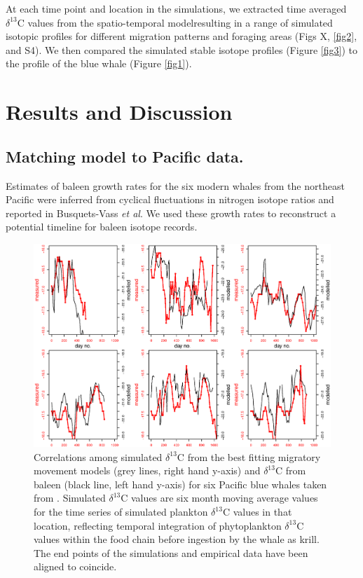 \documentclass[a4paper,12pt]{article}
\begin{document}
At each time point and location in the simulations, we extracted time averaged \(\delta^{13}\)C values from the spatio-temporal model\cite{magozzi2017using}resulting in a range of simulated isotopic profiles for different migration patterns and foraging areas (Figs X, \ref{fig2}, and S4).
We then compared the simulated stable isotope profiles (Figure \ref{fig3}) to the profile of the blue whale (Figure \ref{fig1}).

\section{Results and Discussion}

\subsection{Matching model to Pacific data.}

Estimates of baleen growth rates for the six modern whales from the northeast Pacific were inferred from cyclical fluctuations in nitrogen isotope ratios and reported in Busquets-Vass \textit{et al}\cite{busquets2017estimating}. 
We used these growth rates to reconstruct a potential timeline for baleen isotope records.

\begin{figure}
 \centering
  \includegraphics[width = \linewidth]{figures/figure-Pacific-draft.eps}
  \caption{Correlations among simulated $\delta^{13}$C from the best fitting migratory movement models (grey lines, right hand y-axis) and $\delta^{13}$C from baleen (black line, left hand y-axis) for six Pacific blue whales taken from \cite{busquets2017estimating}. 
  Simulated $\delta^{13}$C values are six month moving average values for the time series of simulated plankton $\delta^{13}$C values in that location, reflecting temporal integration of phytoplankton $\delta^{13}$C values within the food chain before ingestion by the whale as krill. 
  The end points of the simulations and empirical data have been aligned to coincide.
}
  \label{pacific}
\end{figure}
\end{document}
